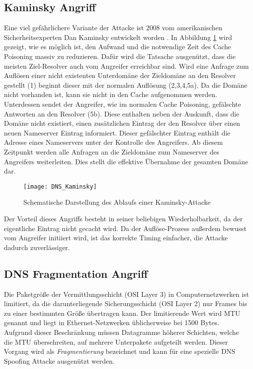 \subsection{Kaminsky Angriff}
Eine viel gefährlichere Variante der Attacke ist 2008 vom amerikanischen Sicherheitsexperten Dan Kaminsky entwickelt worden \cite{Son2010}. In Abbildung \ref{img:dnskaminsky} wird gezeigt, wie es möglich ist, den Aufwand und die notwendige Zeit des Cache Poisoning massiv zu reduzieren. Dafür wird die Tatsache ausgenützt, dass die meisten Ziel-Resolver auch vom Angreifer erreichbar sind. Wird eine Anfrage zum Auflösen einer nicht existenten Unterdomäne der Zieldomäne an den Resolver gestellt (1) beginnt dieser mit der normalen Auflösung (2,3,4,5a). Da die Domäne nicht vorhanden ist, kann sie nicht in den Cache aufgenommen werden. Unterdessen sendet der Angreifer, wie im normalen Cache Poisoning, gefälschte Antworten an den Resolver (5b). Diese enthalten neben der Auskunft, dass die Domäne nicht existiert, einen zusätzlichen Eintrag der den Resolver über einen neuen Nameserver Eintrag informiert. Dieser gefälschter Eintrag enthält die Adresse eines Nameservers unter der Kontrolle des Angreifers. Ab diesem Zeitpunkt werden alle Anfragen an die Zieldomäne zum Nameserver des Angreifers weiterleiten. Dies stellt die effektive Übernahme der gesamten Domäne dar.

\begin{figure}[!hb]
    \centering
    \texttt{[image: DNS\_Kaminsky]}
    \caption{Schematische Darstellung des Ablaufs einer Kaminsky-Attacke}
    \label{img:dnskaminsky}
\end{figure}

Der Vorteil dieses Angriffs besteht in seiner beliebigen Wiederholbarkeit, da der eigentliche Eintrag nicht gecacht wird. Da der Auflöse-Prozess außerdem bewusst vom Angreifer initiiert wird, ist das korrekte Timing einfacher, die Attacke dadurch zuverlässiger.

\subsection{DNS Fragmentation Angriff}
Die Paketgröße der Vermittlungsschicht (OSI Layer 3) in Computernetzwerken ist limitiert, da die darunterliegende Sicherungsschicht (OSI Layer 2) nur Frames bis zu einer bestimmten Größe übertragen kann. Der limitierende Wert wird \ac{MTU} genannt und liegt in Ethernet-Netzwerken üblicherweise bei 1500 Bytes. Aufgrund dieser Beschränkung müssen Datagramme höherer Schichten, welche die MTU überschreiten, auf mehrere Unterpakete aufgeteilt werden. Dieser Vorgang wird als \textit{Fragmentierung} bezeichnet und kann für eine spezielle DNS Spoofing Attacke ausgenützt werden.

